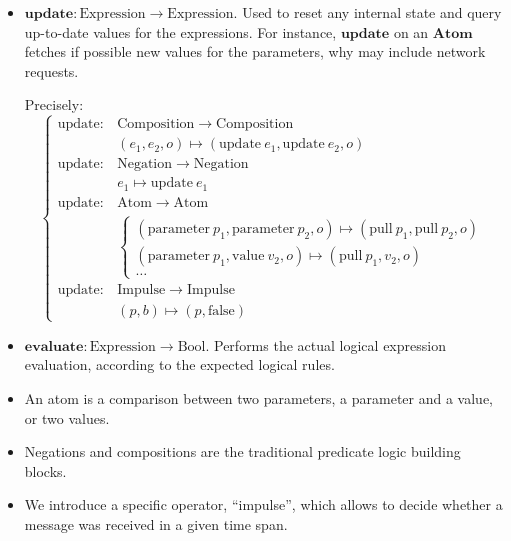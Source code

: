 \documentclass[applsci,article,submit,moreauthors,pdftex,10pt,a4paper]{mdpi}
\begin{document}
\begin{itemize}
    \item $\mathbf{update}: \mathrm{Expression} \rightarrow \mathrm{Expression}$. Used to reset any internal state and query up-to-date values for the expressions. For instance, $\mathbf{update}$ on an $\mathbf{Atom}$ fetches if possible new values for the parameters, why may include network requests.
    
    Precisely:
    \[
    \begin{cases}
    \mathrm{update} : & \mathrm{Composition} \rightarrow \mathrm{Composition} \\ 
    & (e_1, e_2, o) \mapsto (\mathrm{update}~e_1, \mathrm{update}~e_2, o) \\
    \mathrm{update} : & \mathrm{Negation} \rightarrow \mathrm{Negation} \\
    &  e_1 \mapsto \mathrm{update}~ e_1 \\
    \mathrm{update} :&  \mathrm{Atom} \rightarrow \mathrm{Atom} \\
    & \begin{cases}
    (\mathrm{parameter}~p_1, \mathrm{parameter}~p_2, o) \mapsto (\mathrm{pull}~p_1, \mathrm{pull}~p_2, o) \\
    (\mathrm{parameter}~p_1, \mathrm{value}~v_2, o) \mapsto (\mathrm{pull}~p_1, v_2, o) \\ 
    \dots
    \end{cases}\\
    \mathrm{update} : & \mathrm{Impulse} \rightarrow \mathrm{Impulse} \\
    & (p, b) \mapsto (p, \mathrm{false})
    \end{cases}
    \] 
        
    \item $\mathbf{evaluate}: \mathrm{Expression} \rightarrow \mathrm{Bool}$. Performs the actual logical expression evaluation, according to the expected logical rules.
\end{itemize}

\begin{itemize}
    \item An atom is a comparison between two parameters, a parameter and a value, or two values.
    \item Negations and compositions are the traditional predicate logic building blocks.
    \item We introduce a specific operator, ``impulse'', which allows to decide whether a message was received in a given time span.
\end{itemize}
\end{document}
